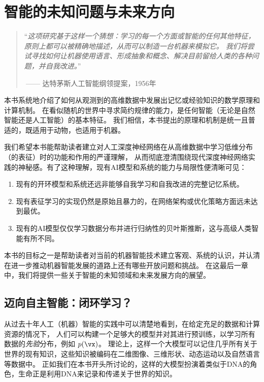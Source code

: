\documentclass[../../book-main_zh.tex]{subfiles}
\begin{document}
\chapter{智能的未知问题与未来方向}
\label{ch:future}

\begin{quote}
    ``{\em 这项研究基于这样一个猜想：学习的每一个方面或智能的任何其他特征，原则上都可以被精确地描述，从而可以制造一台机器来模拟它。
    我们将尝试寻找如何让机器使用语言、形成抽象和概念、解决目前留给人类的各种问题，并自我改进。}''

    $~$\hfill —— 达特茅斯人工智能纲领提案，1956年
\end{quote}
\vspace{5mm}

本书系统地介绍了如何从观测到的高维数据中发展出记忆或经验知识的数学原理和计算机制。
在看似随机的世界中寻求简约规律的能力，是任何智能（无论是自然智能还是人工智能）的基本特征。
我们相信，本书提出的原理和机制是统一且普适的，既适用于动物，也适用于机器。

我们希望本书能帮助读者建立对人工深度神经网络在从高维数据中学习低维分布（的表征）时的功能和作用的严谨理解，
从而彻底澄清围绕现代深度神经网络实践的神秘感。有了这种理解，现有AI模型和系统的能力与局限性便清晰可见：
\begin{enumerate}
    \item 现有的开环模型和系统还远非能够自我学习和自我改进的完整记忆系统。
    \item 现有表征学习的实现仍然是原始且暴力的，在网络架构或优化策略方面远未达到最优。
    \item 现有的AI模型仅仅学习数据分布并进行归纳性的贝叶斯推断，这与高级人类智能有所不同。
\end{enumerate}

本书的目标之一是帮助读者对当前的机器智能技术建立客观、系统的认识，并认清在进一步推动机器智能发展的道路上还有哪些开放问题和挑战。
在这最后一章中，我们将提供一些关于智能的未知领域和未来发展方向的展望。

\section{迈向自主智能：闭环学习？}
从过去十年人工（机器）智能的实践中可以清楚地看到，在给定充足的数据和计算资源的情况下，
人们可以构建一个足够大的模型并对其进行预训练，以学习所有数据的\textit{先验}分布，例如 \(p(\vx)\)。
理论上，这样一个大模型可以记住几乎所有关于世界的现有知识，这些知识被编码在二维图像、三维形状、动态运动以及自然语言等数据中。
正如我们在本书开头所讨论的，这样的大模型扮演着类似于DNA的角色，生命正是利用DNA来记录和传递关于世界的知识。
\end{document}
